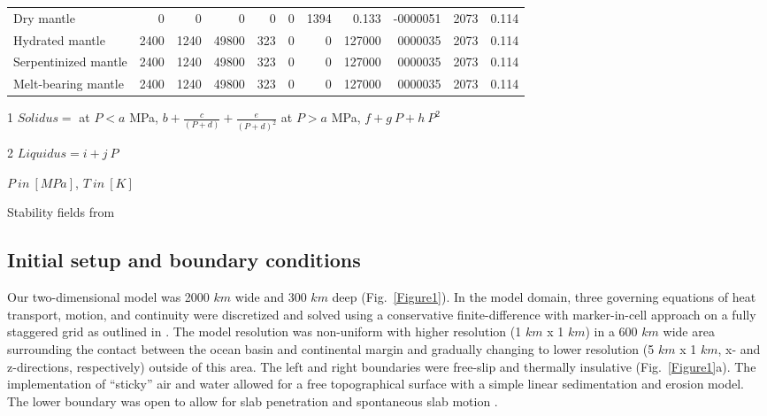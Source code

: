 \documentclass[draft]{assets/agujournal2019}
\begin{document}
\begin{table}
\begin{threeparttable}
\begin{tabularx}{\textwidth}{L{3} R{0.75} R{0.75} R{0.75} R{0.75} R{0.75} R{0.75} R{0.75} R{1.25} R{0.75} R{0.75}}
   Dry mantle                & 0                                         & 0                                          & 0     & 0   & 0        & 1394 & 0.133  & -0000051 & 2073 & 0.114 \\

   Hydrated mantle           & 2400                                      & 1240                                       & 49800 & 323 & 0        & 0    & 127000 & 0000035  & 2073 & 0.114 \\

   Serpentinized mantle      & 2400                                      & 1240                                       & 49800 & 323 & 0        & 0    & 127000 & 0000035  & 2073 & 0.114 \\

   Melt-bearing mantle       & 2400                                      & 1240                                       & 49800 & 323 & 0        & 0    & 127000 & 0000035  & 2073 & 0.114 \\

   \midrule

   \bottomrule
  \end{tabularx}
  \begin{tablenotes}
   \footnotesize
   \item[1] $Solidus =$ at $P<a$ MPa, $b+\frac{c}{(P+d)}+\frac{e}{(P+d)^2}$ at $P>a$ MPa, $f+g~P+h~P^2$
   \item[2] $Liquidus = i+j~P$
   \item $P~in~[MPa]$, $T~in~[K]$
   \item Stability fields from 
  \end{tablenotes}
 \end{threeparttable}
\end{table}

\subsection{Initial setup and boundary conditions}
Our two-dimensional model was 2000 $km$ wide and 300 $km$ deep (Fig.~\ref{Figure1}). In the model domain, three governing equations of heat transport, motion, and continuity were discretized and solved using a conservative finite-difference with marker-in-cell approach on a fully staggered grid as outlined in . The model resolution was non-uniform with higher resolution (1 $km$ x 1 $km$) in a 600 $km$ wide area surrounding the contact between the ocean basin and continental margin and gradually changing to lower resolution (5 $km$ x 1 $km$, x- and z-directions, respectively) outside of this area. The left and right boundaries were free-slip and thermally insulative (Fig.~\ref{Figure1}a). The implementation of “sticky” air and water allowed for a free topographical surface with a simple linear sedimentation and erosion model. The lower boundary was open to allow for slab penetration and spontaneous slab motion \cite{Burg2005}.
\end{document}
